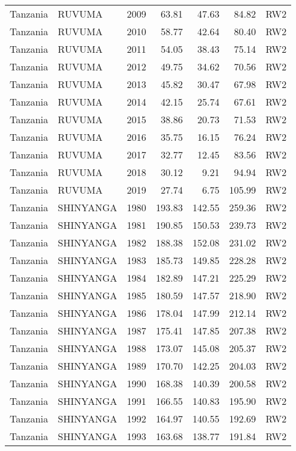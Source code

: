 \begin{longtable}{lllrrrl}
  Tanzania & RUVUMA & 2009 & 63.81 & 47.63 & 84.82 & RW2 \\ 
  Tanzania & RUVUMA & 2010 & 58.77 & 42.64 & 80.40 & RW2 \\ 
  Tanzania & RUVUMA & 2011 & 54.05 & 38.43 & 75.14 & RW2 \\ 
  Tanzania & RUVUMA & 2012 & 49.75 & 34.62 & 70.56 & RW2 \\ 
  Tanzania & RUVUMA & 2013 & 45.82 & 30.47 & 67.98 & RW2 \\ 
  Tanzania & RUVUMA & 2014 & 42.15 & 25.74 & 67.61 & RW2 \\ 
  Tanzania & RUVUMA & 2015 & 38.86 & 20.73 & 71.53 & RW2 \\ 
  Tanzania & RUVUMA & 2016 & 35.75 & 16.15 & 76.24 & RW2 \\ 
  Tanzania & RUVUMA & 2017 & 32.77 & 12.45 & 83.56 & RW2 \\ 
  Tanzania & RUVUMA & 2018 & 30.12 & 9.21 & 94.94 & RW2 \\ 
  Tanzania & RUVUMA & 2019 & 27.74 & 6.75 & 105.99 & RW2 \\ 
  Tanzania & SHINYANGA & 1980 & 193.83 & 142.55 & 259.36 & RW2 \\ 
  Tanzania & SHINYANGA & 1981 & 190.85 & 150.53 & 239.73 & RW2 \\ 
  Tanzania & SHINYANGA & 1982 & 188.38 & 152.08 & 231.02 & RW2 \\ 
  Tanzania & SHINYANGA & 1983 & 185.73 & 149.85 & 228.28 & RW2 \\ 
  Tanzania & SHINYANGA & 1984 & 182.89 & 147.21 & 225.29 & RW2 \\ 
  Tanzania & SHINYANGA & 1985 & 180.59 & 147.57 & 218.90 & RW2 \\ 
  Tanzania & SHINYANGA & 1986 & 178.04 & 147.99 & 212.14 & RW2 \\ 
  Tanzania & SHINYANGA & 1987 & 175.41 & 147.85 & 207.38 & RW2 \\ 
  Tanzania & SHINYANGA & 1988 & 173.07 & 145.08 & 205.37 & RW2 \\ 
  Tanzania & SHINYANGA & 1989 & 170.70 & 142.25 & 204.03 & RW2 \\ 
  Tanzania & SHINYANGA & 1990 & 168.38 & 140.39 & 200.58 & RW2 \\ 
  Tanzania & SHINYANGA & 1991 & 166.55 & 140.83 & 195.90 & RW2 \\ 
  Tanzania & SHINYANGA & 1992 & 164.97 & 140.55 & 192.69 & RW2 \\ 
  Tanzania & SHINYANGA & 1993 & 163.68 & 138.77 & 191.84 & RW2 \\ 

\end{longtable}
